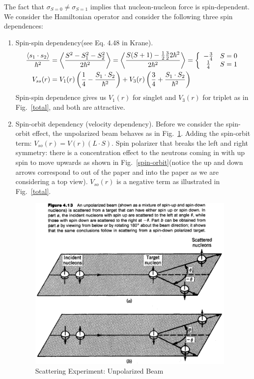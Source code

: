 \documentclass{school-22.101-notes}
\begin{document}
The fact that $\sigma_{S=0} \neq \sigma_{S=1}$ implies that nucleon-nucleon force is spin-dependent. We consider the Hamiltonian operator and consider the following three spin dependences: 
\begin{enumerate}
\item Spin-spin dependency(see Eq. 4.48 in Krane). 
\begin{align}
 \frac{\left< s_1 \cdot s_2 \right>}{\hbar^2} &= \left< \frac{S^2 - S_1^2 - S_2^2}{2 \hbar^2} \right>  =  \left< \frac{S(S+1) - \frac{1}{2} \frac{3}{2} 2 \hbar^2}{2 \hbar^2}  \right> = \left\{  \begin{array}{cc} - \frac{3}{4} & S = 0 \\ \frac{1}{4}  & S= 1 \end{array} \right. \\
V_{ss} (r) &= V_1 (r) \left( \frac{1}{4} - \frac{S_1 \cdot S_2}{\hbar^2} \right) + V_3 (r) \left( \frac{3}{4} + \frac{S_1 \cdot S_2}{\hbar^2} \right)
\end{align}
Spin-spin dependence gives us $V_1(r)$ for singlet and $V_3(r)$ for triplet as in Fig.~\ref{total}, and both are attractive.


\item Spin-orbit dependency (velocity dependency). Before we consider the spin-orbit effect, the unpolarized beam behaves as in Fig.~\ref{un-spin-orbit}. Adding the spin-orbit term: $\displaystyle V_{so}(r) = V (r) (L \cdot S)$. Spin polarizer that breaks the left and right symmetry: there is a concentration effect to the neutrons coming in with up spin to move upwards as shown in Fig.~\ref{spin-orbit}(notice the up and down arrows correspond to out of the paper and into the paper as we are considering a top view). $V_{so}(r)$ is a negative term as illustrated in Fig.~\ref{total}. 

  \begin{figure}[ht]
    \centering
    \includegraphics[width=4in]{images/scattering/un-spin-orbit.png}
    \caption{Scattering Experiment: Unpolarized Beam} \label{un-spin-orbit}
  \end{figure}


\end{enumerate}
\end{document}
